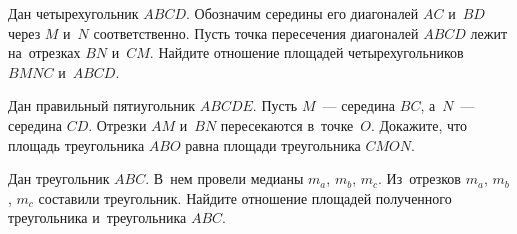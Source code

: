 \begin{problems}
\item
Дан четырехугольник $ABCD$.
Обозначим середины его диагоналей $AC$ и~$BD$ через $M$ и~$N$ соответственно.
Пусть точка пересечения диагоналей $ABCD$ лежит на~отрезках $BN$ и~$CM$.
Найдите отношение площадей четырехугольников $BMNC$ и~$ABCD$.

\item
Дан правильный пятиугольник $ABCDE$.
Пусть $M$~--- середина $BC$, а~$N$~--- середина $CD$.
Отрезки $AM$ и~$BN$ пересекаются в~точке~$O$.
Докажите, что площадь треугольника $ABO$ равна площади треугольника $CMON$.

\item
Дан треугольник $ABC$.
В~нем провели медианы $m_{a}$, $m_{b}$, $m_{c}$.
Из~отрезков $m_{a}$, $m_{b}$, $m_{c}$ составили треугольник.
Найдите отношение площадей полученного треугольника и~треугольника $ABC$.

\end{problems}

